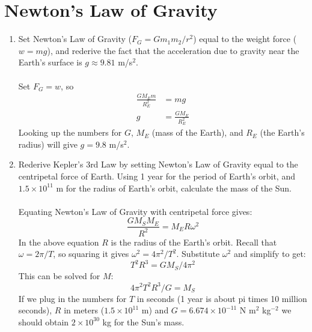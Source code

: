 \documentclass[10pt]{article}
\begin{document}
\section{Newton's Law of Gravity}
\begin{enumerate}
\item Set Newton's Law of Gravity ($F_G = G m_1 m_2 / r^2$) equal to the weight force ($w = mg$), and rederive the fact that the acceleration due to gravity near the Earth's surface is $g\approx 9.81$ m/s$^2$. \\ \\
Set $F_G = w$, so 
\begin{align}
\frac{G M_E m}{R_E^2} &= mg \\
g &= \frac{G M_E}{R_E^2}
\end{align}
Looking up the numbers for $G$, $M_E$ (mass of the Earth), and $R_E$ (the Earth's radius) will give $g=9.8$ m/s$^2$.
\item Rederive Kepler's 3rd Law by setting Newton's Law of Gravity equal to the centripetal force of Earth. Using 1 year for the period of Earth's orbit, and $1.5 \times 10^{11}$ m for the radius of Earth's orbit, calculate the mass of the Sun. \\ \\
Equating Newton's Law of Gravity with centripetal force gives:
\begin{equation}
\frac{G M_S M_E}{R^2} = M_E R \omega^2
\end{equation}
In the above equation $R$ is the radius of the Earth's orbit.  Recall that $\omega = 2\pi/T$, so squaring it gives $\omega^2 = 4\pi^2/T^2$.  Substitute $\omega^2$ and simplify to get:
\begin{equation}
T^2 R^3 = G M_S/4\pi^2
\end{equation}
This can be solved for $M$:
\begin{equation}
4\pi^2 T^2 R^3/G = M_S 
\end{equation}
If we plug in the numbers for $T$ in seconds (1 year is about pi times 10 million seconds), $R$ in meters ($1.5 \times 10^{11}$ m) and $G = 6.674 \times 10^{-11}$ N m$^2$ kg$^{-2}$ we should obtain $2 \times 10^{30}$ kg for the Sun's mass.
\end{enumerate}
\end{document}
